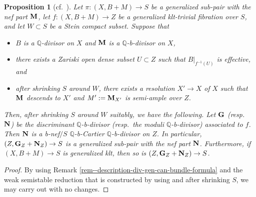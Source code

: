 \documentclass[12pt]{amsart}
\newtheorem{prop}[thm]{Proposition}
\theoremstyle{definition}
\begin{document}
\begin{prop}[cf.~{\cite[Theorem 4.12]{filipazzi-gen-can-bundle-formula}}]\label{prop--gen-can-bundle-formula-semiample}
Let $\pi \colon (X,B+M) \to S$ be a generalized sub-pair with the nef part $\boldsymbol{\rm M}$, let  $f\colon (X,B+M) \to Z$ be a generalized klt-trivial fibration over $S$, and let $W \subset S$ be a Stein compact subset. 
Suppose that
\begin{itemize}
\item
$B$ is a $\mathbb{Q}$-divisor on $X$ and $\boldsymbol{\rm M}$ is a $\mathbb{Q}$-b-divisor on $X$, 
\item
there exists a Zariski open dense subset $U \subset Z$ such that $B|_{f^{-1}(U)}$ is effective, and
\item
after shrinking $S$ around $W$, there exists a resolution $X' \to X$ of $X$ such that $\boldsymbol{\rm M}$ descends to $X'$ and $M':=\boldsymbol{\rm M}_{X'}$ is semi-ample over $Z$. 
\end{itemize}
Then, after shrinking $S$ around $W$ suitably, we have the following.
Let $\boldsymbol{\rm G}$ (resp.~$\boldsymbol{\rm N}$) be the discriminant $\mathbb{Q}$-b-divisor (resp.~the moduli $\mathbb{Q}$-b-divisor) associated to $f$. 
Then $\boldsymbol{\rm N}$ is a b-nef$/S$ $\mathbb{Q}$-b-Cartier $\mathbb{Q}$-b-divisor on $Z$. 
In particular, $(Z, \boldsymbol{\rm G}_{Z} +\boldsymbol{\rm N}_{Z}) \to S$ is a generalized sub-pair with the nef part $\boldsymbol{\rm N}$. 
Furthermore, if $(X,B+M) \to S$ is generalized klt, then so is $(Z, \boldsymbol{\rm G}_{Z} +\boldsymbol{\rm N}_{Z}) \to S$. 
\end{prop}


\begin{proof}
By using Remark \ref{rem--description-div-gen-can-bundle-formula} and the weak semistable reduction that is constructed by using \cite[Theorem 9.5]{karu-phdthesis} and \cite[Subsection 4.5]{eh-semistablereduction} after shrinking $S$, we may carry out \cite[Proof of Theorem 4.12]{filipazzi-gen-can-bundle-formula} with no changes. 
\end{proof}
\end{document}
